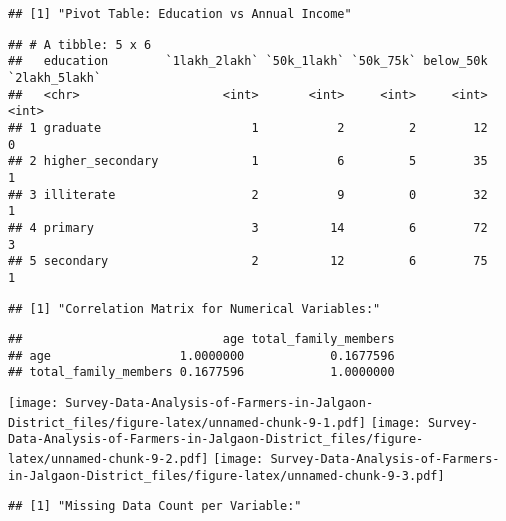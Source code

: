 \documentclass[
]{article}
\begin{document}
\begin{verbatim}
## [1] "Pivot Table: Education vs Annual Income"
\end{verbatim}

\begin{verbatim}
## # A tibble: 5 x 6
##   education        `1lakh_2lakh` `50k_1lakh` `50k_75k` below_50k `2lakh_5lakh`
##   <chr>                    <int>       <int>     <int>     <int>         <int>
## 1 graduate                     1           2         2        12             0
## 2 higher_secondary             1           6         5        35             1
## 3 illiterate                   2           9         0        32             1
## 4 primary                      3          14         6        72             3
## 5 secondary                    2          12         6        75             1
\end{verbatim}

\begin{verbatim}
## [1] "Correlation Matrix for Numerical Variables:"
\end{verbatim}

\begin{verbatim}
##                            age total_family_members
## age                  1.0000000            0.1677596
## total_family_members 0.1677596            1.0000000
\end{verbatim}

\texttt{[image: Survey-Data-Analysis-of-Farmers-in-Jalgaon-District\_files/figure-latex/unnamed-chunk-9-1.pdf]}
\texttt{[image: Survey-Data-Analysis-of-Farmers-in-Jalgaon-District\_files/figure-latex/unnamed-chunk-9-2.pdf]}
\texttt{[image: Survey-Data-Analysis-of-Farmers-in-Jalgaon-District\_files/figure-latex/unnamed-chunk-9-3.pdf]}

\begin{verbatim}
## [1] "Missing Data Count per Variable:"
\end{verbatim}
\end{document}
